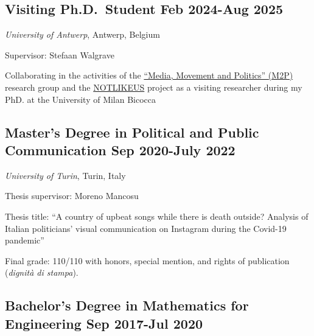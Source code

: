 \documentclass[10pt,]{article}
\providecommand{\tightlist}{%
  \setlength{\itemsep}{0pt}\setlength{\parskip}{0pt}}
\renewenvironment{itemize}{
  \begin{list}{}{
    \setlength{\leftmargin}{1.5em}
  }
}{
  \end{list}
}
\begin{document}
\subsection{\texorpdfstring{Visiting Ph.D.~Student \hfill Feb 2024-Aug
2025}{Visiting Ph.D.~Student Feb 2024-Aug 2025}}\label{visiting-ph.d.-student-feb-2024-aug-2025}

\begin{itemize}
\tightlist
\item
  \emph{University of Antwerp}, Antwerp, Belgium
\item
  Supervisor: Stefaan Walgrave
\item
  Collaborating in the activities of the
  \href{https://www.uantwerpen.be/en/research-groups/m2p/}{``Media,
  Movement and Politics'' (M2P)} research group and the
  \href{https://notlikeus.be/}{NOTLIKEUS} project as a visiting
  researcher during my PhD. at the University of Milan Bicocca
\end{itemize}

\subsection{\texorpdfstring{Master's Degree in Political and Public
Communication \hfill Sep 2020-July
2022}{Master's Degree in Political and Public Communication Sep 2020-July 2022}}\label{masters-degree-in-political-and-public-communication-sep-2020-july-2022}

\begin{itemize}
\tightlist
\item
  \emph{University of Turin}, Turin, Italy
\item
  Thesis supervisor: Moreno Mancosu
\item
  Thesis title: ``A country of upbeat songs while there is death
  outside? Analysis of Italian politicians' visual communication on
  Instagram during the Covid-19 pandemic''
\item
  Final grade: 110/110 with honors, special mention, and rights of
  publication (\emph{dignità di stampa}).
\end{itemize}

\subsection{\texorpdfstring{Bachelor's Degree in Mathematics for
Engineering \hfill Sep 2017-Jul
2020}{Bachelor's Degree in Mathematics for Engineering Sep 2017-Jul 2020}}\label{bachelors-degree-in-mathematics-for-engineering-sep-2017-jul-2020}
\end{document}
